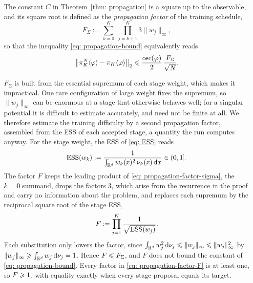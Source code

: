 \documentclass{article}
\begin{document}
The constant $C$ in Theorem~\ref{thm: propagation} is a square up to the observable, and its square root is defined as the \emph{propagation factor} of the training schedule,
\begin{equation}
    F_\Sigma
    := \sum_{k=0}^{K}\ \prod_{j=k+1}^{K} 3\lVert w_j \rVert_\infty ,
    \label{eq: propagation-factor-sigma}
\end{equation}
so that the inequality \eqref{eq: propagation-bound} equivalently reads
\begin{equation*}
    \bigl\lVert \pi_K^N\langle \varphi\rangle - \pi_K\langle \varphi\rangle \bigr\rVert_2
    \leqslant \frac{\operatorname{osc}(\varphi)}{2}\, \frac{F_\Sigma}{\sqrt N}.
\end{equation*}

$F_\Sigma$ is built from the essential supremum of each stage weight, which makes it impractical. One rare configuration of large weight fixes the supremum, so $\lVert w_j \rVert_\infty$ can be enormous at a stage that otherwise behaves well; for a singular potential it is difficult to estimate accurately, and need not be finite at all. We therefore estimate the training difficulty by a second propagation factor, assembled from the ESS of each accepted stage, a quantity the run computes anyway. For the stage weight, the ESS of \eqref{eq: ESS} reads
\begin{equation}
    \mathrm{ESS}(w_k) := \frac{1}{\int_{\mathbb R^d} w_k(x)^2 \, \nu_k(x) \, \mathrm{d} x} \in (0,1] .
    \label{eq: propagation-ESS}
\end{equation}
The factor $F$ keeps the leading product of \eqref{eq: propagation-factor-sigma}, the $k=0$ summand, drops the factors $3$, which arise from the recurrence in the proof and carry no information about the problem, and replaces each supremum by the reciprocal square root of the stage ESS,
\begin{equation}
    F
    := \prod_{j=1}^{K} \frac{1}{\sqrt{\mathrm{ESS}(w_j)}} .
    \label{eq: propagation-factor-F}
\end{equation}
Each substitution only lowers the factor, since $\int_{\mathbb R^d} w_j^2 \, \mathrm{d}\nu_j \leqslant \lVert w_j \rVert_\infty \leqslant \lVert w_j \rVert_\infty^{2}$ by $\lVert w_j \rVert_\infty \geqslant \int_{\mathbb R^d} w_j \, \mathrm{d}\nu_j = 1$. Hence $F \leqslant F_\Sigma$, and $F$ does not bound the constant of \eqref{eq: propagation-bound}. Every factor in \eqref{eq: propagation-factor-F} is at least one, so $F \geqslant 1$, with equality exactly when every stage proposal equals its target.
\end{document}
